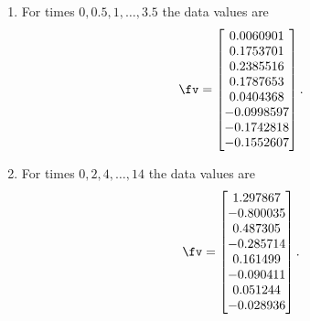 \begin{reduce}
\begin{exercise}
\begin{enumerate}
\item  For times \(0,0.5,1,\ldots,3.5\) the data values are 
\setbox\ajrqrbox\hbox{}\marginajrbox%
\[ \fv=\begin{bmatrix} 0.0060901
\\  0.1753701
\\  0.2385516
\\  0.1787653
\\  0.0404368
\\ -0.0998597
\\ -0.1742818
\\ -0.1552607 \end{bmatrix}.\]
  
\item  For times \(0,2,4,\ldots,14\) the data values are 
\setbox\ajrqrbox\hbox{}\marginajrbox%
\[ \fv=\begin{bmatrix} 1.297867
\\ -0.800035
\\  0.487305
\\ -0.285714
\\  0.161499
\\ -0.090411
\\  0.051244
\\ -0.028936 \end{bmatrix}.\]
  
\end{enumerate}
\end{exercise}





\end{reduce}
